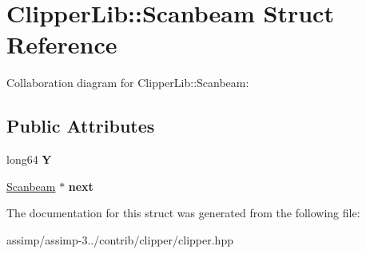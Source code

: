 \hypertarget{struct_clipper_lib_1_1_scanbeam}{\section{Clipper\+Lib\+:\+:Scanbeam Struct Reference}
\label{struct_clipper_lib_1_1_scanbeam}
}


Collaboration diagram for Clipper\+Lib\+:\+:Scanbeam\+:
\subsection*{Public Attributes}
\begin{DoxyCompactItemize}
\item 
\hypertarget{struct_clipper_lib_1_1_scanbeam_a71e4ab9957d1039c6d6666b92236fb71}{long64 {\bfseries Y}}\label{struct_clipper_lib_1_1_scanbeam_a71e4ab9957d1039c6d6666b92236fb71}

\item 
\hypertarget{struct_clipper_lib_1_1_scanbeam_a7e77b169ceff6cd0e079dd0e0b5760e8}{\hyperlink{struct_clipper_lib_1_1_scanbeam}{Scanbeam} $\ast$ {\bfseries next}}\label{struct_clipper_lib_1_1_scanbeam_a7e77b169ceff6cd0e079dd0e0b5760e8}

\end{DoxyCompactItemize}


The documentation for this struct was generated from the following file\+:\begin{DoxyCompactItemize}
\item 
assimp/assimp-\/3../contrib/clipper/clipper.\+hpp\end{DoxyCompactItemize}
